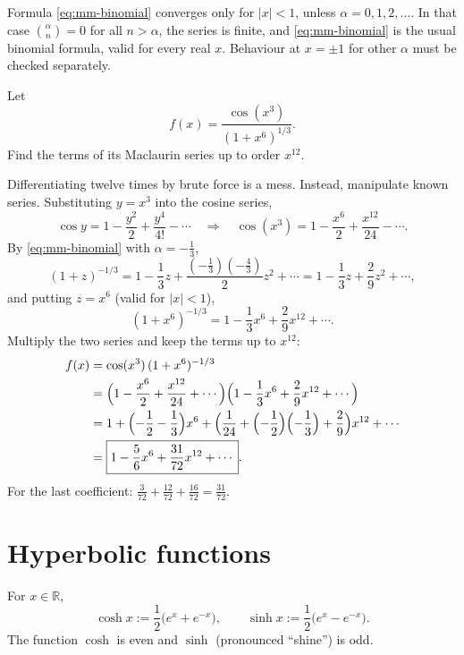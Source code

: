 \begin{remark}
Formula \eqref{eq:mm-binomial} converges only for $|x|<1$, unless
$\alpha=0,1,2,\ldots$. In that case $\binom{\alpha}{n}=0$ for all $n>\alpha$,
the series is finite, and \eqref{eq:mm-binomial} is the usual binomial
formula, valid for every real $x$. Behaviour at $x=\pm1$ for other $\alpha$
must be checked separately.
\end{remark}

\begin{example}
Let
\[
 f(x)=\frac{\cos(x^3)}{(1+x^6)^{1/3}}.
\]
Find the terms of its Maclaurin series up to order $x^{12}$.

Differentiating twelve times by brute force is a mess. Instead, manipulate
known series. Substituting $y=x^3$ into the cosine series,
\[
 \cos y=1-\frac{y^2}{2}+\frac{y^4}{4!}-\cdots
 \quad\Longrightarrow\quad
 \cos(x^3)=1-\frac{x^6}{2}+\frac{x^{12}}{24}-\cdots.
\]
By \eqref{eq:mm-binomial} with $\alpha=-\tfrac13$,
\[
 (1+z)^{-1/3}=1-\frac13z+\frac{(-\frac13)(-\frac43)}{2}z^2+\cdots
 =1-\frac13z+\frac29z^2+\cdots,
\]
and putting $z=x^6$ (valid for $|x|<1$),
\[
 (1+x^6)^{-1/3}=1-\frac13x^6+\frac29x^{12}+\cdots.
\]
Multiply the two series and keep the terms up to $x^{12}$:
\begin{align*}
 f(x)&=\cos(x^3)\,(1+x^6)^{-1/3}\\
 &=\Bigl(1-\frac{x^6}{2}+\frac{x^{12}}{24}+\cdots\Bigr)
   \Bigl(1-\frac13x^6+\frac29x^{12}+\cdots\Bigr)\\
 &=1+\Bigl(-\frac12-\frac13\Bigr)x^6
   +\Bigl(\frac1{24}+\Bigl(-\frac12\Bigr)\Bigl(-\frac13\Bigr)+\frac29\Bigr)x^{12}+\cdots\\
 &=\boxed{1-\frac56x^6+\frac{31}{72}x^{12}+\cdots}.
\end{align*}
For the last coefficient: $\frac{3}{72}+\frac{12}{72}+\frac{16}{72}=\frac{31}{72}$.
\end{example}

\section{Hyperbolic functions}

\begin{definition}
For $x\in\mathbb R$,
\[
 \cosh x:=\frac12\bigl(e^x+e^{-x}\bigr),\qquad
 \sinh x:=\frac12\bigl(e^x-e^{-x}\bigr).
\]
The function $\cosh$ is even and $\sinh$ (pronounced ``shine'') is odd.
\end{definition}

